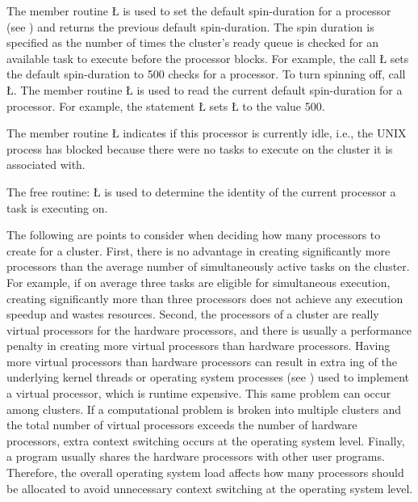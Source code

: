 \documentclass[openright,twoside]{report}
\begin{document}
The member routine \LGinlinetrue\LGbegin\lgrinde\L{}\endlgrinde\LGend{} is used to set the default spin-duration for a processor (see ) and returns the previous default spin-duration.
The spin duration is specified as the number of times the cluster's ready queue is checked for an available task to execute before the processor blocks.
For example, the call \LGinlinetrue\LGbegin\lgrinde\L{}\endlgrinde\LGend{} sets the default spin-duration to 500 checks for a processor.
To turn spinning off, call \LGinlinetrue\LGbegin\lgrinde\L{}\endlgrinde\LGend{}.
The member routine \LGinlinetrue\LGbegin\lgrinde\L{}\endlgrinde\LGend{} is used to read the current default spin-duration for a processor.
For example, the statement \LGinlinetrue\LGbegin\lgrinde\L{}\endlgrinde\LGend{} sets \LGinlinetrue\LGbegin\lgrinde\L{}\endlgrinde\LGend{} to the value 500.

The member routine \LGinlinetrue\LGbegin\lgrinde\L{}\endlgrinde\LGend{} indicates if this processor is currently idle, i.e., the UNIX process has blocked because there were no tasks to execute on the cluster it is associated with.

The free routine:
\LGinlinefalse\LGbegin\lgrinde
\L{}
\endlgrinde\LGend
{}%
is used to determine the identity of the current processor a task is executing on.

The following are points to consider when deciding how many processors to create for a cluster.
First, there is no advantage in creating significantly more processors than the average number of simultaneously active tasks on the cluster.
For example, if on average three tasks are eligible for simultaneous execution, creating significantly more than three processors does not achieve any execution speedup and wastes resources.
Second, the processors of a cluster are really virtual processors for the hardware processors, and there is usually a performance penalty in creating more virtual processors than hardware processors.
Having more virtual processors than hardware processors can result in extra ing of the underlying kernel threads or operating system processes (see ) used to implement a virtual processor, which is runtime expensive.
This same problem can occur among clusters.
If a computational problem is broken into multiple clusters and the total number of virtual processors exceeds the number of hardware processors, extra context switching occurs at the operating system level.
Finally, a \uC program usually shares the hardware processors with other user programs.
Therefore, the overall operating system load affects how many processors should be allocated to avoid unnecessary context switching at the operating system level.
\end{document}
